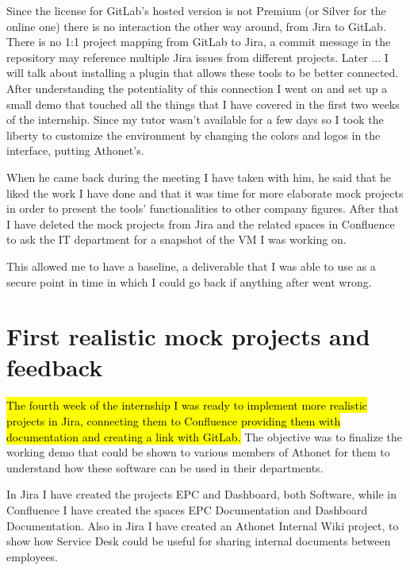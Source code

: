 	Since the license for GitLab's hosted version is not Premium (or Silver for the online one) there is no interaction the other way around, from Jira to GitLab.
	There is no 1:1 project mapping from GitLab to Jira, a commit message in the repository may reference multiple Jira issues from different projects.
	Later ... I will talk about installing a plugin that allows these tools to be better connected.
	After understanding the potentiality of this connection I went on and set up a small demo that touched all the things that I have covered in the first two weeks of the internship.
	Since my tutor wasn't available for a few days so I took the liberty to customize the environment by changing the colors and logos in the interface, putting Athonet's.
	
	
	When he came back during the meeting I have taken with him, he said that he liked the work I have done and that it was time for more elaborate mock projects in order to present the tools' functionalities to other company figures.
	After that I have deleted the mock projects from Jira and the related spaces in Confluence to ask the IT department for a snapshot of the VM I was working on.
	
	This allowed me to have a baseline, a deliverable that I was able to use as a secure point in time in which I could go back if anything after went wrong.
	
\section{First realistic mock projects and feedback}
	
	\hl{The fourth week of the internship I was ready to implement more realistic projects in Jira, connecting them to Confluence providing them with documentation and creating a link with GitLab.}
	The objective was to finalize the working demo that could be shown to various members of Athonet for them to understand how these software can be used in their departments.

	In Jira I have created the projects EPC and Dashboard, both Software, while in Confluence I have created the spaces EPC Documentation and Dashboard Documentation.
	Also in Jira I have created an Athonet Internal Wiki project, to show how Service Desk could be useful for sharing internal documents between employees.
	
